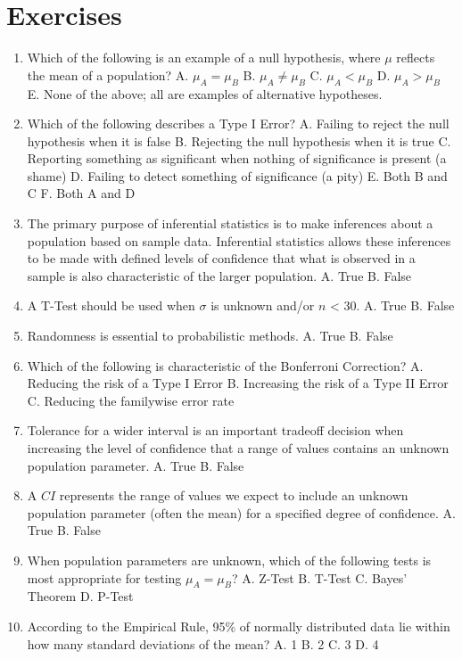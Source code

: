 \documentclass[]{book}
\begin{document}
\hypertarget{exercises-2}{%
\section{Exercises}\label{exercises-2}}

\begin{enumerate}
\def\labelenumi{\arabic{enumi}.}
\item
  Which of the following is an example of a null hypothesis, where \(\mu\) reflects the mean of a population?
  A. \(\mu_A = \mu_B\)
  B. \(\mu_A \neq \mu_B\)
  C. \(\mu_A < \mu_B\)
  D. \(\mu_A > \mu_B\)
  E. None of the above; all are examples of alternative hypotheses.
\item
  Which of the following describes a Type I Error?
  A. Failing to reject the null hypothesis when it is false
  B. Rejecting the null hypothesis when it is true
  C. Reporting something as significant when nothing of significance is present (a shame)
  D. Failing to detect something of significance (a pity)
  E. Both B and C
  F. Both A and D
\item
  The primary purpose of inferential statistics is to make inferences about a population based on sample data. Inferential statistics allows these inferences to be made with defined levels of confidence that what is observed in a sample is also characteristic of the larger population.
  A. True
  B. False
\item
  A T-Test should be used when \(\sigma\) is unknown and/or \(n\) \textless{} 30.
  A. True
  B. False
\item
  Randomness is essential to probabilistic methods.
  A. True
  B. False
\item
  Which of the following is characteristic of the Bonferroni Correction?
  A. Reducing the risk of a Type I Error
  B. Increasing the risk of a Type II Error
  C. Reducing the familywise error rate
\item
  Tolerance for a wider interval is an important tradeoff decision when increasing the level of confidence that a range of values contains an unknown population parameter.
  A. True
  B. False
\item
  A \(CI\) represents the range of values we expect to include an unknown population parameter (often the mean) for a specified degree of confidence.
  A. True
  B. False
\item
  When population parameters are unknown, which of the following tests is most appropriate for testing \(\mu_A = \mu_B\)?
  A. Z-Test
  B. T-Test
  C. Bayes' Theorem
  D. P-Test
\item
  According to the Empirical Rule, 95\% of normally distributed data lie within how many standard deviations of the mean?
  A. 1
  B. 2
  C. 3
  D. 4
\end{enumerate}
\end{document}
